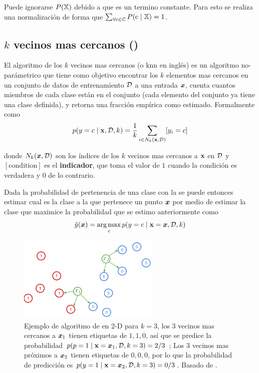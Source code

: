 Puede ignorarse $P({\mathbb{X}})$ debido a que es un termino constante. Para esto se realiza una normalización de forma que $\sum_{\forall {\textnormal{c}} \in {\mathbb{C}}} P({\textnormal{c}}\mid {\mathbb{X}}) = 1$.


\subsection{$k$ vecinos mas cercanos ()}
El algoritmo de los $k$ vecinos mas cercanos (o \gls{knn} en inglés) es un algoritmo no-parámetrico que tiene como objetivo encontrar los $k$ elementos mas cercanos en un conjunto de datos de entrenamiento $\mathcal{D}$ a una entrada ${\bm{x}}$, cuenta cuantos miembros de cada clase están en el conjunto (cada elemento del conjunto ya tiene una clase definida), y retorna una fracción empírica como estimado. Formalmente como
\begin{equation} \label{eq:prob-knn}
  p(y = c \mid {\mathbf{x}}, \mathcal{D}, k) = \frac{1}{k} \sum_{i \in N_k({\mathbf{x}}, \mathcal{D})} [y_i = c]
\end{equation}

donde $N_k({\bm{x}}, \mathcal{D})$ son los índices de los $k$ vecinos mas cercanos a ${\mathbf{x}}$ en $\mathcal{D}$ y $[\mathrm{condition}]$ es el \textbf{indicador}, que toma el valor de $1$ cuando la condición es verdadera y $0$ de lo contrario.

Dada la probabilidad de pertenencia de una clase con la  se puede entonces estimar cual es la clase a la que pertenece un punto ${\bm{x}}$ por medio de estimar la clase que maximice la probabilidad que se estimo anteriormente como
\begin{equation}
  \hat{y}({\bm{x}}) = \operatorname*{arg\,max}_{c} p(y = c \mid {\mathbf{x}} = {\bm{x}}, \mathcal{D}, k)
\end{equation}

\begin{figure}[H]
  \centering
  \includegraphics[width=0.60\textwidth]{Figures/knn-example.pdf}
  \decoRule
  \caption[Ejemplo de algoritmo de \textsl{}]{Ejemplo de algoritmo de \textsl{} en 2-D para $k = 3$, los 3 vecinos mas cercanos a ${\bm{x}}_1$ tienen etiquetas de $1, 1, 0$, así que se predice la probabilidad $p(p = 1 \mid {\mathbf{x}} = {\bm{x}}_1, \mathcal{D}, k=3) = 2/3$ ; Los 3 vecinos mas próximos a ${\bm{x}}_2$ tienen etiquetas de $0, 0, 0$, por lo que la probabilidad de predicción es $p(y=1 \mid {\mathbf{x}} = {\bm{x}}_2, \mathcal{D}, k=3) = 0/3$. Basado de \cite{murphymachinel}.}
  \label{fig:knn-example}
\end{figure}

